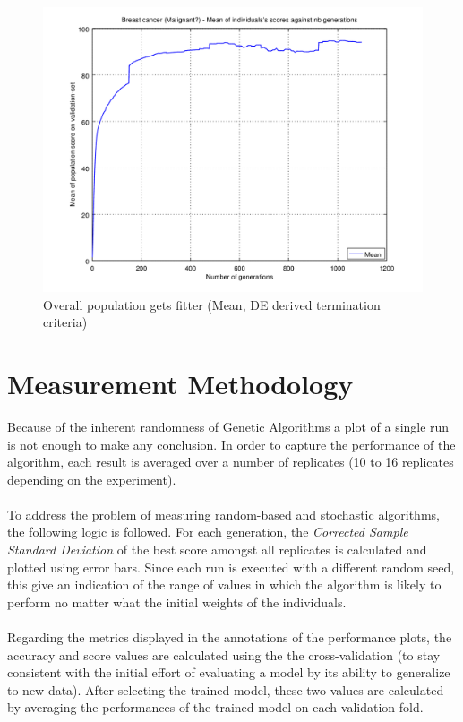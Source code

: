 \documentclass[a4paper,12pt, oneside]{memoir}
\begin{document}
\begin{figure}[h]
  \centering
  \includegraphics[scale=0.7]{malignant-meanVSepochs-DE-derived-rand}
  \vspace{-12pt}
  \caption{Overall population gets fitter (Mean, DE derived termination criteria)}
  \label{malignant-mean-DE-derived-rand}
\end{figure}

\clearpage

\section{Measurement Methodology}

Because of the inherent randomness of Genetic Algorithms a plot of a single run is not enough to make any conclusion. In order to capture the performance of the algorithm, each result is averaged over a number of replicates (10 to 16 replicates depending on the experiment). 
\\ \\
To address the problem of measuring random-based and stochastic algorithms, the following logic is followed. For each generation, the \textit{Corrected Sample Standard Deviation} of the best score amongst all replicates is calculated and plotted using error bars. Since each run is executed with a different random seed, this give an indication of the range of values in which the algorithm is likely to perform no matter what the initial weights of the individuals. 
\\ \\
Regarding the metrics displayed in the annotations of the performance plots, the accuracy and score values are calculated using the the cross-validation (to stay consistent with the initial effort of evaluating a model by its ability to generalize to new data). After selecting the trained model, these two values are calculated by averaging the performances of the trained model on each validation fold.
\end{document}
